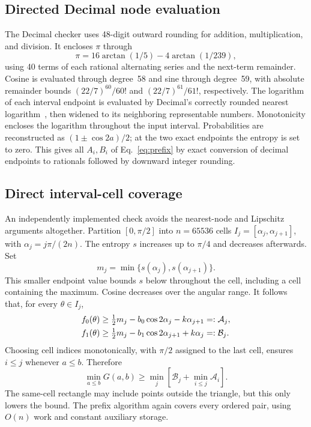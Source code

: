 \documentclass[aps,pra,reprint,amsmath,amssymb,longbibliography,nofootinbib]{revtex4-2}
\begin{document}
\subsection{Directed Decimal node evaluation}

The Decimal checker uses 48-digit outward rounding for addition,
multiplication, and division. It encloses $\pi$ through
\begin{equation}
 \pi=16\arctan(1/5)-4\arctan(1/239),
\end{equation}
using 40 terms of each rational alternating series and the next-term
remainder. Cosine is evaluated through degree~58 and sine through
degree~59, with absolute remainder bounds
$(22/7)^{60}/60!$ and $(22/7)^{61}/61!$, respectively. The logarithm of
each interval endpoint is evaluated by Decimal's correctly rounded
nearest logarithm~\cite{PythonDecimal}, then widened to its neighboring representable numbers.
Monotonicity encloses the logarithm throughout the input interval.
Probabilities are reconstructed as $(1\pm\cos2a)/2$; at the two exact
endpoints the entropy is set to zero. This gives all $A_i,B_i$ of
Eq.~\eqref{eq:prefix} by exact conversion of decimal endpoints to rationals
followed by downward integer rounding.

\subsection{Direct interval-cell coverage}

An independently implemented check avoids the nearest-node and Lipschitz
arguments altogether. Partition $[0,\pi/2]$ into $n=65536$ cells
$I_j=[\alpha_j,\alpha_{j+1}]$, with $\alpha_j=j\pi/(2n)$.
The entropy $s$ increases up to $\pi/4$ and decreases afterwards. Set
\[
 m_j=\min\{s(\alpha_j),s(\alpha_{j+1})\}.
\]
This smaller endpoint value bounds $s$ below throughout the cell, including
a cell containing the maximum. Cosine decreases over the angular range.
It follows
that, for every $\theta\in I_j$,
\begin{align}
 f_0(\theta)&\geq\tfrac12m_j-b_0\cos2\alpha_j-k\alpha_{j+1}
 =:\mathcal A_j,\notag\\
 f_1(\theta)&\geq\tfrac12m_j-b_1\cos2\alpha_{j+1}+k\alpha_j
 =:\mathcal B_j.
 \label{eq:cells}
\end{align}
Choosing cell indices monotonically, with $\pi/2$ assigned to the last
cell, ensures $i\leq j$ whenever $a\leq b$. Therefore
\begin{equation}
 \min_{a\leq b}G(a,b)\geq
 \min_j\left[\mathcal B_j+\min_{i\leq j}\mathcal A_i\right].
 \label{eq:cellprefix}
\end{equation}
The same-cell rectangle may include points outside the triangle, but this
only lowers the bound. The prefix algorithm again covers every ordered
pair, using $O(n)$ work and constant auxiliary storage.
\end{document}
